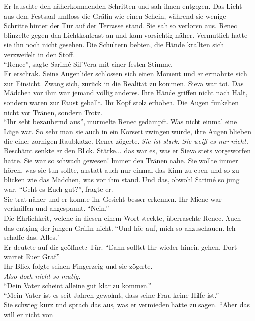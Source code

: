 Er lauschte den näherkommenden Schritten und sah ihnen entgegen. Das Licht aus dem Festsaal umfloss 
die Gräfin wie einen Schein, während sie wenige Schritte hinter der Tür auf der Terrasse stand. Sie 
sah so verloren aus. Renec blinzelte gegen den Lichtkontrast an und kam vorsichtig näher. Vermutlich 
hatte sie ihn noch nicht gesehen.  Die Schultern bebten, die Hände krallten sich verzweifelt in den 
Stoff.\\
``Renec'', sagte Sarimé Sil'Vera mit einer festen Stimme.\\
Er erschrak. Seine Augenlider schlossen sich einen Moment und er ermahnte sich zur Einsicht. 
Zwang sich, zurück in die Realität zu kommen. Sieva war tot. Das Mädchen vor ihm war jemand völlig 
anderes. Ihre Hände griffen nicht nach Halt, sondern waren zur Faust geballt. Ihr Kopf stolz 
erhoben. Die Augen funkelten nicht vor Tränen, sondern Trotz. \\
``Ihr seht bezaubernd aus'', murmelte Renec gedämpft. Was nicht einmal eine Lüge war. So sehr man 
sie auch in ein Korsett zwingen würde, ihre Augen blieben die einer zornigen Raubkatze. Renec 
zögerte. \textit{Sie ist stark. Sie weiß es nur nicht.}\\
Beschämt senkte er den Blick. Stärke... das war es, was er Sieva stets vorgeworfen hatte. Sie war 
so schwach gewesen! Immer den Tränen nahe. Sie wollte immer hören, was sie tun sollte, anstatt auch 
nur einmal das Kinn zu eben und so zu blicken wie das Mädchen, was vor ihm stand. Und das, obwohl 
Sarimé so jung war. ``Geht es Euch gut?'', fragte er.\\
Sie trat näher und er konnte ihr Gesicht besser erkennen. Ihr Miene war verkniffen und angespannt.
``Nein.''\\
Die Ehrlichkeit, welche in diesen einem Wort steckte, überraschte Renec. Auch das entging der 
jungen Gräfin nicht. ``Und hör auf, mich so anzuschauen. Ich schaffe das. Alles.''\\
Er deutete auf die geöffnete Tür. ``Dann solltet Ihr wieder hinein gehen. Dort wartet Euer Graf.''\\
Ihr Blick folgte seinen Fingerzeig und sie zögerte.\\
\textit{Also doch nicht so mutig.}\\
``Dein Vater scheint alleine gut klar zu kommen.''\\
``Mein Vater ist es seit Jahren gewohnt, dass seine Frau keine Hilfe ist.''\\
Sie schwieg kurz und sprach das aus, was er vermieden hatte zu sagen. ``Aber das will er nicht von 
